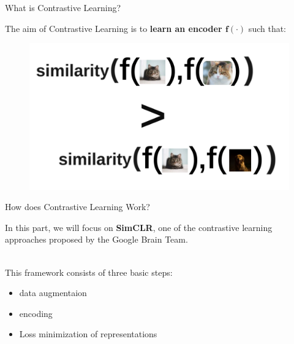 \documentclass[aspectratio=169,mathserif]{beamer}  %
\newcommand{\tb}{\textbf}
\begin{document}
\begin{frame}{What is Contrastive Learning?}

The aim of Contrastive Learning is to \tb{learn an encoder $\bm{f}(\cdot)$} such that:

\begin{figure}[t]
\centerline{\includegraphics[width=0.7\linewidth]{figure9.pdf}}
\label{fig1}
\end{figure}

\end{frame}



\begin{frame}{How does Contrastive Learning Work?}

In this part, we will focus on \tb{SimCLR}, one of the contrastive learning approaches proposed by the Google Brain Team. 

\pause

~\\
This framework consists of three basic steps:

\begin{itemize}
    \item data augmentaion
    \item encoding
    \item Loss minimization of representations
\end{itemize}

\end{frame}
\end{document}
